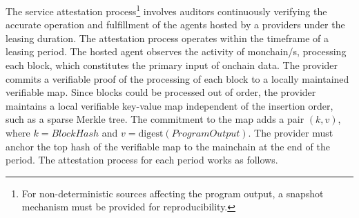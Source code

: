 \documentclass{oc}
\begin{document}
The service attestation process\footnote{
  For non-deterministic sources affecting the program output, a snapshot mechanism must be provided for reproducibility.
} involves \glspl{auditor} continuously verifying the accurate operation and fulfillment of the agents hosted by a \glspl{provider} under the leasing duration.
The attestation process operates within the timeframe of a leasing period.
The hosted \gls{agent} observes the activity of \gls{monchain}/s, processing each block, which constitutes the primary input of onchain data.
The \gls{provider} commits a verifiable proof of the processing of each block to a locally maintained verifiable map.
Since blocks could be processed out of order, the \gls{provider} maintains a local verifiable key-value map independent of the insertion order, such as a sparse Merkle tree\cite{cryptoeprint:2016/683}.
The commitment to the map adds a pair $(k, v)$, where $k=BlockHash$ and $v=\text{digest}(ProgramOutput)$.
The \gls{provider} must anchor the top hash of the verifiable map to the \gls{mainchain} at the end of the period.
The attestation process for each period works as follows.
\end{document}
